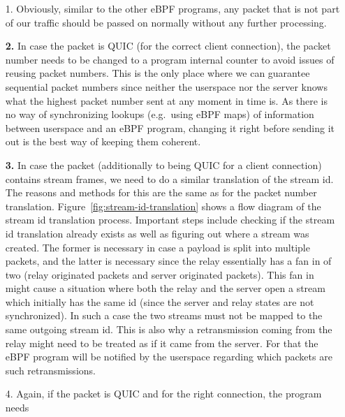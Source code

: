 \begin{enumerate}
    \item[1.]   Obviously, similar to the other eBPF programs, any packet that is not part of our traffic 
            should be passed on normally without any further processing.
    \item[\textbf{2.}] In case the packet is QUIC (for the correct client connection), the packet number 
            needs to be changed to a program internal counter to avoid issues of reusing packet numbers. 
            This is the only place where we can guarantee sequential packet numbers since neither 
            the userspace nor the server knows what the highest packet number sent at any moment in time is. 
            As there is no way of synchronizing lookups (e.g.~using eBPF maps) of information between userspace 
            and an eBPF program, changing it right before sending it out is the best way of keeping them coherent. 
    \item[\textbf{3.}] In case the packet (additionally to being QUIC for a client connection) contains 
                        stream frames, we need to do a similar translation of the stream id.
                        The reasons and methods for this are the same as for the packet number translation.
                        Figure~\ref{fig:stream-id-translation} shows a flow diagram of the stream id translation
                        process.
                        Important steps include checking if the stream id translation already exists as well
                        as figuring out where a stream was created.
                        The former is necessary in case a payload is split into multiple packets, and the latter is 
                        necessary since the relay essentially has a fan in of two (relay originated packets and 
                        server originated packets).
                        This fan in might cause a situation where both the relay and the server open a stream which 
                        initially has the same id (since the server and relay states are not synchronized).
                        In such a case the two streams must not be mapped to the same outgoing stream id.  
                        This is also why a retransmission coming from the relay might need to be treated as 
                        if it came from the server. For that the eBPF program will be notified by the userspace 
                        regarding which packets are such retransmissions.
    \item[4.] Again, if the packet is QUIC and for the right connection, the program needs 

\end{enumerate}

